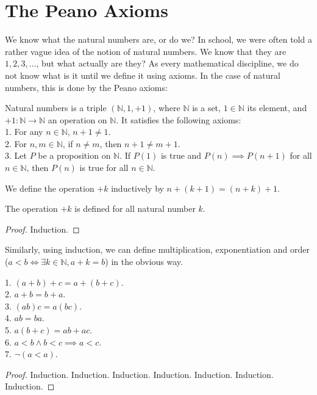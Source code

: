 \section{The Peano Axioms}
We know what the natural numbers are, or do we?
In school, we were often told a rather vague idea of the notion of natural numbers.
We know that they are $1,2,3,\ldots$, but what actually are they?
As every mathematical discipline, we do not know what is it until we define it using axioms.
In the case of natural numbers, this is done by the Peano axioms:
\begin{definition}
    Natural numbers is a triple $(\mathbb N, 1, +1)$, where $\mathbb N$ is a set, $1\in\mathbb N$ its element, and $+1:\mathbb N\to\mathbb N$ an operation on $\mathbb N$.
    It satisfies the following axioms:\\
    1. For any $n\in\mathbb N$, $n+1\neq 1$.\\
    2. For $n,m\in\mathbb N$, if $n\neq m$, then $n+1\neq m+1$.\\
    3. Let $P$ be a proposition on $\mathbb N$. If $P(1)$ is true and $P(n)\implies P(n+1)$ for all $n\in\mathbb N$, then $P(n)$ is true for all $n\in\mathbb N$.
\end{definition}
\begin{definition}[Addition]
    We define the operation $+k$ inductively by $n+(k+1)=(n+k)+1$.
\end{definition}
\begin{proposition}
    The operation $+k$ is defined for all natural number $k$.
\end{proposition}
\begin{proof}
    Induction.
\end{proof}
Similarly, using induction, we can define multiplication, exponentiation and order ($a<b\iff\exists k\in\mathbb N, a+k=b$) in the obvious way.
\begin{proposition}
    1. $(a+b)+c=a+(b+c)$.\\
    2. $a+b=b+a$.\\
    3. $(ab)c=a(bc)$.\\
    4. $ab=ba$.\\
    5. $a(b+c)=ab+ac$.\\
    6. $a<b\land b<c\implies a<c$.\\
    7. $\lnot(a<a)$.
\end{proposition}
\begin{proof}
    Induction. Induction. Induction. Induction. Induction. Induction. Induction.
\end{proof}
